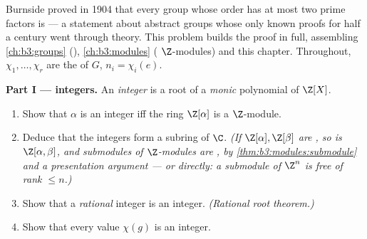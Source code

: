 \begin{problem}\label{pb:b3:representations:1}
Burnside proved in 1904 that every group whose order has at most
two prime factors is  --- a statement about abstract
groups whose only known proofs for half a century went through
 theory. This problem builds the proof in full,
assembling \cref{ch:b3:groups} (),
\cref{ch:b3:modules} ( $\Z$-modules) and this
chapter. Throughout, $\chi_1, \dots, \chi_r$ are the 
 of $G$, $n_i = \chi_i(e)$.

\medskip
\noindent\textbf{Part I ---  integers.} An
\emph{ integer} is a root of a \emph{monic} polynomial
of $\Z[X]$.
\begin{enumerate}
  \item Show that $\alpha$ is an  integer iff the ring
        $\Z[\alpha]$ is a  $\Z$-module.
  \item Deduce that the  integers form a subring of
        $\C$. \emph{(If $\Z[\alpha], \Z[\beta]$ are , so is $\Z[\alpha, \beta]$, and submodules of
         $\Z$-modules are ,
        by \cref{thm:b3:modules:submodule} and a presentation
        argument --- or directly: a submodule of $\Z^n$ is free
        of rank $\leq n$.)}
  \item Show that a \emph{rational}  integer is an
        integer. \emph{(Rational root theorem.)}
  \item Show that every  value $\chi(g)$ is an
         integer.
\end{enumerate}


\end{problem}

